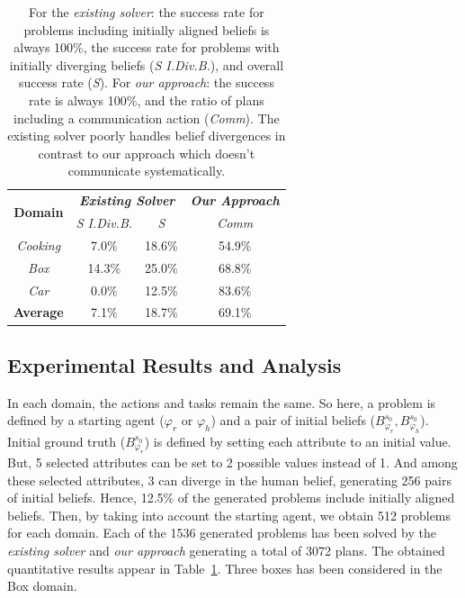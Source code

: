 \documentclass[letterpaper]{article} %
\begin{document}
\begin{table}
    \begin{adjustbox}{width=0.77\columnwidth,center}
    \begin{tabular}{@{}c|c c| c@{}}
        \multirow{2}{*}{\textbf{Domain}} & \multicolumn{2}{c|}{\textbf{\textit{Existing Solver}}} & \multicolumn{1}{c}{\textbf{\textit{Our Approach}}}
        \\
        & \multicolumn{1}{c}{\textit{S I.Div.B.}} & \multicolumn{1}{c|}{\textit{S}} & \multicolumn{1}{c}{\textit{Comm}} 
        \\ \cline{1-4}
        \textit{Cooking}    &  7.0\% & 18.6\% & 54.9\%\\
        \textit{Box}        & 14.3\% & 25.0\% & 68.8\%\\
        \textit{Car}        &  0.0\% & 12.5\% & 83.6\%\\
        \hline
        \textbf{Average}    &  7.1\% & 18.7\% & 69.1\%\\
    \end{tabular}
    \end{adjustbox}
    \caption
    {
    \label{tab:q_results}
    For the \textit{existing solver}: the success rate for problems including initially aligned beliefs is always 100\%, the success rate for problems with initially diverging beliefs (\textit{S I.Div.B.}), and overall success rate (\textit{S}). For \textit{our approach}: the success rate is always 100\%, and the ratio of plans including a communication action (\textit{Comm}). 
    The existing solver poorly handles belief divergences in contrast to our approach which doesn't communicate systematically.
    }
\end{table}

\subsection{Experimental Results and Analysis}

In each domain, the actions and tasks remain the same. So here, a problem is defined by a starting agent ($\varphi_r$ or $\varphi_h$) and a pair of initial beliefs ($B_{\varphi_r}^{s_0}, B_{\varphi_h}^{s_0}$).
Initial ground truth ($B_{\varphi_r}^{s_0}$) is defined by setting each attribute to an initial value. But, 5 selected attributes can be set to 2 possible values instead of 1. And among these selected attributes, 3 can diverge in the human belief, generating 256 pairs of initial beliefs. Hence, 12.5\% of the generated problems include initially aligned beliefs. Then, by taking into account the starting agent, we obtain 512 problems for each domain. 
Each of the 1536 generated problems has been solved by the \textit{existing solver} and \textit{our approach} generating a total of 3072 plans. The obtained quantitative results appear in Table~\ref{tab:q_results}.
Three boxes has been considered in the Box domain.
\end{document}
